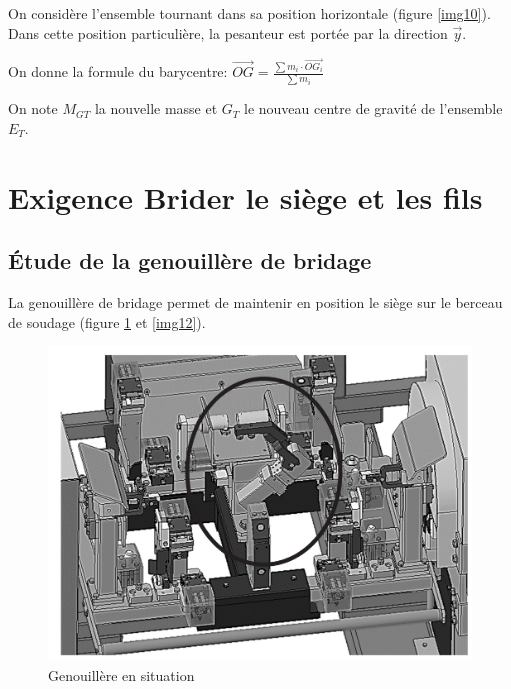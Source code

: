 On considère l’ensemble tournant dans sa position horizontale (figure \ref{img10}). Dans cette position particulière, la pesanteur est portée par la direction $\vec{y}$.

On donne la formule du barycentre:
$\overrightarrow{OG}=\frac{\sum m_i\cdot \overrightarrow{OG_i}}{\sum m_i}$



On note $M_{GT}$ la nouvelle masse et $G_T$ le nouveau centre de gravité de l’ensemble $E_T$.


\section{Exigence \og Brider le siège et les fils \fg}

\subsection{Étude de la genouillère de bridage}

La genouillère de bridage permet de maintenir en position le siège sur le berceau de soudage (figure \ref{img11} et \ref{img12}).

\begin{figure}[!h]
\centering\includegraphics[width=0.7\linewidth]{img/fig11}
 \caption{Genouillère en situation}
 \label{img11}
\end{figure}

